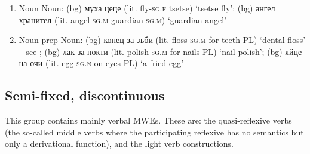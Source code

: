 \documentclass[output=paper,colorlinks,citecolor=brown]{langscibook}
\begin{document}
\begin{enumerate}
    \item Noun Noun: 
    (bg) {муха цеце } (lit. fly-\textsc{sg.f} tsetse) {`tsetse fly'};
    (bg) {ангел хранител } (lit. angel-\textsc{sg.m} gua\-rdian-\textsc{sg.m}) {`guardian angel'}
    \item Noun prep Noun: (bg) {конец за зъби } (lit. floss-\textsc{sg.m} for teeth-PL) {`dental floss'} -- see ;
    (bg) {лак за нокти } (lit. polish-\textsc{sg.m} for nails-PL) {`nail polish'}; 
(bg) {яйце на очи } (lit. egg-\textsc{sg.n} on eyes-PL) {`a fried egg'}
\end{enumerate}


\subsection{Semi-fixed, discontinuous}

This group contains mainly verbal MWEs. These are: the quasi-reflexive verbs (the so-called middle verbs where the participating reflexive has no semantics but only a derivational function), and the light verb constructions.
\end{document}
